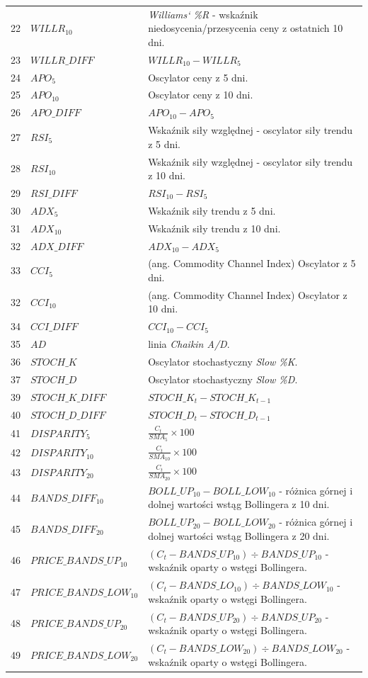 \documentclass[a4paper, twoside, 11pt, openright]{article}
\begin{document}
\begin{longtable}[c]{| m{0.5cm} m{5cm} m{10cm}|}
 22 & $WILLR_{10}$ & \textit{Williams` \%R} - wskaźnik niedosycenia/przesycenia ceny z ostatnich 10 dni.  \\
 23 & $WILLR\_DIFF$ & $WILLR_{10}-WILLR_{5}$ \\
  24 & $APO_{5}$ & Oscylator ceny z 5 dni. \\
 25 & $APO_{10}$ & Oscylator ceny z 10 dni.  \\
 26 & $APO\_DIFF$ & $APO_{10}-APO_{5}$ \\
  27 & $RSI_{5}$ & Wskaźnik siły względnej - oscylator siły trendu z 5 dni. \\
 28 & $RSI_{10}$ & Wskaźnik siły względnej - oscylator siły trendu z 10 dni.\\
 29 & $RSI\_DIFF$ & $RSI_{10}-RSI_{5}$ \\
  30 & $ADX_{5}$ & Wskaźnik siły trendu z 5 dni. \\
 31 & $ADX_{10}$ & Wskaźnik siły trendu z 10 dni. \\
 32 & $ADX\_DIFF$ & $ADX_{10}-ADX_{5}$ \\
 33 & $CCI_{5}$ & (ang. Commodity Channel Index) Oscylator z 5 dni. \\
 32 & $CCI_{10}$ & (ang. Commodity Channel Index) Oscylator z 10 dni. \\
 34 & $CCI\_DIFF$ & $CCI_{10}-CCI_{5}$ \\
 35 & $AD$ & linia \textit{Chaikin A/D}.  \\
 36 & $STOCH\_K$ & Oscylator stochastyczny \textit{Slow \%K}. \\
 37 & $STOCH\_D$ & Oscylator stochastyczny \textit{Slow \%D}.\\
 39 & $STOCH\_K\_DIFF$ & $STOCH\_K_{t}-STOCH\_K_{t-1}$ \\
 40 & $STOCH\_D\_DIFF$ & $STOCH\_D_{t}-STOCH\_D_{t-1}$  \\
 41 & $DISPARITY_{5}$ &  $\frac{C_t}{SMA_5}\times 100$ \\
 42 & $DISPARITY_{10}$ & $\frac{C_t}{SMA_10}\times 100$ \\
 43 & $DISPARITY_{20}$ & $\frac{C_t}{SMA_20}\times 100$ \\
 44 & $BANDS\_DIFF_{10}$ & $BOLL\_UP_{10} - BOLL\_LOW_{10}$ - różnica górnej i dolnej wartości wstąg Bollingera z 10 dni.  \\
 45 & $BANDS\_DIFF_{20}$ & $BOLL\_UP_{20} - BOLL\_LOW_{20}$ - różnica górnej i dolnej wartości wstąg Bollingera z 20 dni.  \\
46 & $PRICE\_BANDS\_UP_{10}$ & $(C_t-BANDS\_UP_{10})\div BANDS\_UP_{10}$ - wskaźnik oparty o wstęgi Bollingera.  \\
 47 & $PRICE\_BANDS\_LOW_{10}$ & $(C_t-BANDS\_LO_{10})\div BANDS\_LOW_{10}$ - wskaźnik oparty o wstęgi Bollingera.\\
 48 & $PRICE\_BANDS\_UP_{20}$ & $(C_t-BANDS\_UP_{20})\div BANDS\_UP_{20}$ - wskaźnik oparty o wstęgi Bollingera.\\
 49 & $PRICE\_BANDS\_LOW_{20}$ & $(C_t-BANDS\_LOW_{20})\div BANDS\_LOW_{20}$ - wskaźnik oparty o wstęgi Bollingera.\\
     
\end{longtable}
\end{document}
